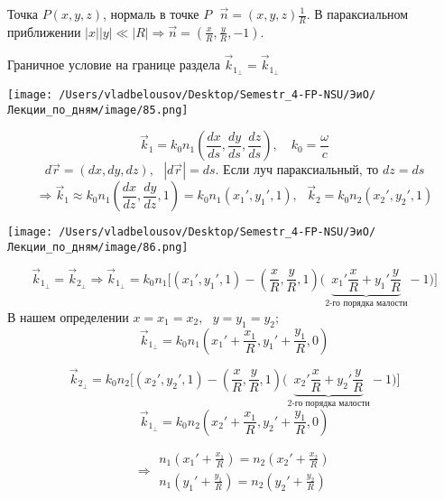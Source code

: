 \documentclass[12pt, a4paper]{report}
\begin{document}
Точка \( P (x,y,z) \), нормаль в точке \( P \text{ } \vec{n }  = \displaystyle (x,y,z )\frac{1}{R}  \). В параксиальном приближении \( \displaystyle  |x| |y| \ll |R| \Rightarrow \vec{n }  = (\frac{x}{R } , \frac{y}{R } , - 1 )\).

Граничное условие на границе раздела \( \vec{k } _{1_{\perp}  } = \vec{k}_{1_{\perp} }    \) 

\begin{center}
    \texttt{[image: /Users/vladbelousov/Desktop/Semestr\_4-FP-NSU/ЭиО/Лекции\_по\_дням/image/85.png]}
\end{center}  

\[ \vec{k }  _1 = k_0 n_1 \left( \frac{dx }{ds } , \frac{dy}{ds }  , \frac{dz}{ds}   \right)  , \quad k_0 = \frac{\omega}{c } \] 
\[ d \vec{r }  = (dx , dy ,dz ) , \text{ }  |d \vec{r }  | = ds. \text{ Если луч параксиальный, то } dz = ds  \]  
\[\Rightarrow \vec{k}_1 \approx k_0 n_1 \displaystyle \left( \frac{dx}{dz }  , \frac{dy}{dz } , 1     \right) = k_0 n_1 (x_1 ' , y_1 ', 1 ) , \text{ }  \vec{k }  _2 = k_0 n_2 (x_2' ,y_2' , 1)   \]  
\begin{center}
    \texttt{[image: /Users/vladbelousov/Desktop/Semestr\_4-FP-NSU/ЭиО/Лекции\_по\_дням/image/86.png]}
\end{center}  
\[ \vec{k }  _{1_{\perp } } = \vec{k }  _{2_{\perp } } \Rightarrow \vec{k}_{1_{\perp } } = k_0 n_1 \bigg[ (x_1 ' , y_1 ' , 1 ) - \left( \frac{x}{R } , \frac{y}{R } , 1  \right) \bigg(\underbrace{ x_1 ' \frac{x}{R }  + y_1 ' \frac{y}{R} }_{\text{2-го порядка малости}}- 1  \bigg)\bigg]   \] 
В нашем определении \( x = x_1 = x_2 , \text{ }  y = y_1 = y_2 ; \) 
\[ \vec{k }  _{1_{\perp } } = k_0 n_1 \left( x_1 ' + \frac{x_1}{R }  , y_1 ' + \frac{y_1}{R },0  \right)  \] 

\[\vec{k}_{2_{\perp } } = k_0 n_2 \bigg[ (x_2 ' , y_2 ' , 1 ) - \left( \frac{x}{R } , \frac{y}{R } , 1  \right) \bigg(\underbrace{ x_2 ' \frac{x}{R }  + y_2 ' \frac{y}{R} }_{\text{2-го порядка малости}}- 1  \bigg)\bigg]   \] 
\[ \vec{k }  _{1_{\perp } } = k_0 n_2 \left( x_2 ' + \frac{x_1}{R }  , y_2 ' + \frac{y_1}{R },0  \right)  \] 

\[ \Rightarrow \begin{aligned}
    n_1 \left( x_1' + \frac{x_1}{R }  \right) = n_2 \left(  x_2 ' + \frac{x_2}{R}  \right) \\
    n_1 \left( y_1' + \frac{y_1}{R }  \right) = n_2 \left(  y_2 ' + \frac{y_2}{R}  \right)
\end{aligned}\] 
\end{document}
